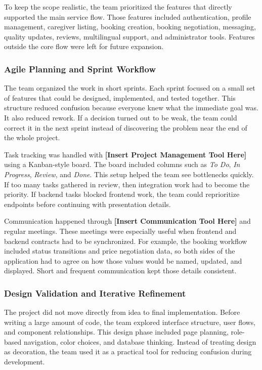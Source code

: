 \documentclass[12pt,a4paper]{article}
\begin{document}
To keep the scope realistic, the team prioritized the features that directly supported the main service flow. Those features included authentication, profile management, caregiver listing, booking creation, booking negotiation, messaging, quality updates, reviews, multilingual support, and administrator tools. Features outside the core flow were left for future expansion.

\subsubsection{Agile Planning and Sprint Workflow}

The team organized the work in short sprints. Each sprint focused on a small set of features that could be designed, implemented, and tested together. This structure reduced confusion because everyone knew what the immediate goal was. It also reduced rework. If a decision turned out to be weak, the team could correct it in the next sprint instead of discovering the problem near the end of the whole project.

Task tracking was handled with \textbf{[Insert Project Management Tool Here]} using a Kanban-style board. The board included columns such as \textit{To Do}, \textit{In Progress}, \textit{Review}, and \textit{Done}. This setup helped the team see bottlenecks quickly. If too many tasks gathered in review, then integration work had to become the priority. If backend tasks blocked frontend work, the team could reprioritize endpoints before continuing with presentation details.

Communication happened through \textbf{[Insert Communication Tool Here]} and regular meetings. These meetings were especially useful when frontend and backend contracts had to be synchronized. For example, the booking workflow included status transitions and price negotiation data, so both sides of the application had to agree on how those values would be named, updated, and displayed. Short and frequent communication kept those details consistent.

\subsubsection{Design Validation and Iterative Refinement}

The project did not move directly from idea to final implementation. Before writing a large amount of code, the team explored interface structure, user flows, and component relationships. This design phase included page planning, role-based navigation, color choices, and database thinking. Instead of treating design as decoration, the team used it as a practical tool for reducing confusion during development.
\end{document}
